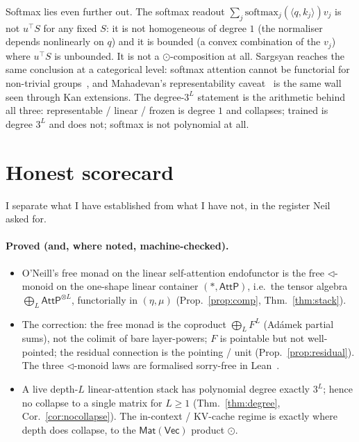 \documentclass[11pt]{article}
\providecommand{\Vec}{}\renewcommand{\Vec}{\mathsf{Vec}}
\newcommand{\Mat}{\mathsf{Mat}}
\newcommand{\AttP}{\mathsf{AttP}}
\theoremstyle{plain}
\theoremstyle{definition}
\begin{document}
Softmax lies even further out. The softmax readout $\sum_{j}\mathrm{softmax}_{j}(\langle q,k_{j}\rangle)v_{j}$ is
not $u^{\!\top}S$ for any fixed $S$: it is not homogeneous of degree $1$ (the normaliser depends nonlinearly on
$q$) and it is bounded (a convex combination of the $v_{j}$) where $u^{\!\top}S$ is unbounded. It is not a
$\odot$-composition at all. Sargsyan reaches the same conclusion at a categorical level: softmax attention cannot
be functorial for non-trivial groups~\cite{sargsyan}, and Mahadevan's representability caveat~\cite[\S10.6]{ket} is
the same wall seen through Kan extensions. The degree-$3^{L}$ statement is the arithmetic behind all three:
representable / linear / frozen is degree $1$ and collapses; trained is degree $3^{L}$ and does not; softmax is not
polynomial at all.

\section{Honest scorecard}\label{sec:scorecard}

I separate what I have established from what I have not, in the register Neil asked for.

\paragraph{Proved (and, where noted, machine-checked).}
\begin{itemize}[leftmargin=1.4em,itemsep=1pt]
\item O'Neill's free monad on the linear self-attention endofunctor is the free $\lhd$-monoid on the one-shape
  linear container $(\ast,\AttP)$, i.e.\ the tensor algebra $\bigoplus_{L}\AttP^{\otimes L}$, functorially in
  $(\eta,\mu)$ (Prop.~\ref{prop:comp}, Thm.~\ref{thm:stack}).
\item The correction: the free monad is the coproduct $\bigoplus_{L}F^{L}$ (Adámek partial sums), not the colimit
  of bare layer-powers; $F$ is pointable but not well-pointed; the residual connection is the pointing / unit
  (Prop.~\ref{prop:residual}). The three $\lhd$-monoid laws are formalised sorry-free in Lean~\cite{leanfree}.
\item A live depth-$L$ linear-attention stack has polynomial degree exactly $3^{L}$; hence no collapse to a single
  matrix for $L\ge 1$ (Thm.~\ref{thm:degree}, Cor.~\ref{cor:nocollapse}). The in-context / KV-cache regime is
  exactly where depth does collapse, to the $\Mat(\Vec)$ product $\odot$.
\end{itemize}
\end{document}
